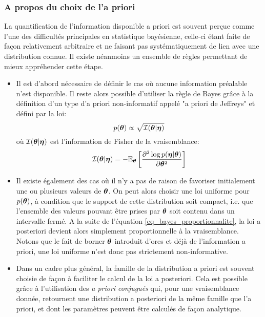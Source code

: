 \subsubsection{A propos du choix de l'a priori}

La quantification de l'information disponible a priori est souvent perçue comme l'une des difficultés principales en statistique bayésienne, celle-ci étant faite de façon relativement arbitraire et ne faisant pas systématiquement de lien avec une distribution connue. Il existe néanmoins un ensemble de règles permettant de mieux appréhender cette étape.

\begin{itemize}

	\item Il est d'abord nécessaire de définir le cas où aucune information préalable n'est disponible. Il reste alors possible d'utiliser la règle de Bayes grâce à la définition d'un type d'a priori non-informatif appelé "a priori de Jeffreys" et défini par la loi:\\
	\begin{equation}
		p({\bm{\theta}}) \propto \sqrt{\mathcal{I}({\bm{\theta}} | {\bm{\eta}})}
		\label{eq_jeffreys}
	\end{equation}
	où $\mathcal{I}({\bm{\theta}} | {\bm{\eta}})$ est l'information de Fisher de la vraisemblance:
	\begin{equation}
		\mathcal{I}({\bm{\theta}} | {\bm{\eta}}) = -\mathbb{E}_{\bm{\theta}}\left[\dfrac{\partial^2 \log p({\bm{\eta}}|{\bm{\theta}})}{\partial {\bm{\theta}}^2}\right]
	\end{equation}

	\item Il existe également des cas où il n'y a pas de raison de favoriser initialement une ou plusieurs valeurs de ${\bm{\theta}}$. On peut alors choisir une loi uniforme pour $p({\bm{\theta}})$, à condition que le support de cette distribution soit compact, i.e. que l'ensemble des valeurs pouvant être prises par ${\bm{\theta}}$ soit contenu dans un intervalle fermé. A la suite de l'équation \eqref{eq_bayes_proportionnalite}, la loi a posteriori devient alors simplement proportionnelle à la vraisemblance. Notons que le fait de borner ${\bm{\theta}}$ introduit d'ores et déjà de l'information a priori, une loi uniforme n'est donc pas strictement non-informative.\\

	\item Dans un cadre plus général, la famille de la distribution a priori est souvent choisie de façon à faciliter le calcul de la loi a posteriori. Cela est possible grâce à l'utilisation des \textit{a priori conjugués} qui, pour une vraisemblance donnée, retournent une distribution a posteriori de la même famille que l'a priori, et dont les paramètres peuvent être calculés de façon analytique.\\
\end{itemize}


